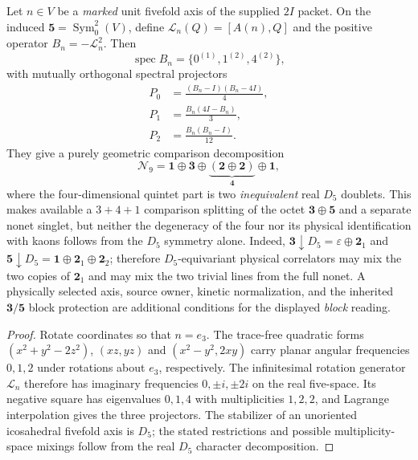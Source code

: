 \documentclass[12pt,a4paper]{article}
\begin{document}
\begin{proposition}
\label{p11:prop:v159-fivefold-axial-nonet-resolution}
Let $n\in V$ be a \emph{marked} unit fivefold axis of the supplied
$2I$ packet. On the induced $\mathbf5=\operatorname{Sym}_0^2(V)$,
define $\mathcal L_n(Q)=[A(n),Q]$ and the positive operator
$B_n=-\mathcal L_n^2$. Then
\[
\boxed{\operatorname{spec}B_n=\{0^{(1)},1^{(2)},4^{(2)}\},}
\]
with mutually orthogonal spectral projectors
\[
\boxed{\begin{aligned}
 P_0&=\frac{(B_n-I)(B_n-4I)}4,\\
 P_1&=\frac{B_n(4I-B_n)}3,\\
 P_2&=\frac{B_n(B_n-I)}{12}.
\end{aligned}}
\]
They give a purely geometric comparison decomposition
\[
\boxed{\mathcal N_9=\mathbf1\oplus\mathbf3
  \oplus\underbrace{(\mathbf2\oplus\mathbf2)}_{\mathbf4}
  \oplus\mathbf1,}
\]
where the four-dimensional quintet part is two \emph{inequivalent}
real $D_5$ doublets. This makes available a $3+4+1$ comparison
splitting of the octet $\mathbf3\oplus\mathbf5$ and a separate
nonet singlet, but neither the degeneracy of the four nor its physical
identification with kaons follows from the $D_5$ symmetry alone.
Indeed, $\mathbf3\downarrow D_5=\varepsilon\oplus\mathbf2_1$ and
$\mathbf5\downarrow D_5=\mathbf1\oplus\mathbf2_1\oplus\mathbf2_2$;
therefore $D_5$-equivariant physical correlators may mix the two
copies of $\mathbf2_1$ and may mix the two trivial lines from the
full nonet. A physically selected axis, source owner, kinetic
normalization, and the inherited $\mathbf3/\mathbf5$ block
protection are additional conditions for the displayed \emph{block}
reading.
\end{proposition}
\begin{proof}
Rotate coordinates so that $n=e_3$. The trace-free quadratic
forms $(x^2+y^2-2z^2)$, $(xz,yz)$ and
$(x^2-y^2,2xy)$ carry planar angular frequencies $0,1,2$
under rotations about $e_3$, respectively. The infinitesimal
rotation generator $\mathcal L_n$ therefore has imaginary
frequencies $0,\pm i,\pm2i$ on the real five-space.
Its negative square has eigenvalues $0,1,4$ with multiplicities
$1,2,2$, and Lagrange interpolation gives the three projectors.
The stabilizer of an unoriented icosahedral fivefold axis is $D_5$;
the stated restrictions and possible multiplicity-space mixings
follow from the real $D_5$ character decomposition.
\end{proof}
\end{document}
